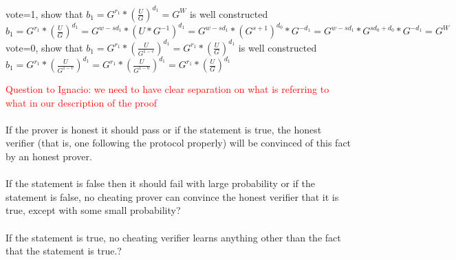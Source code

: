 \begin{infobox}[Explanation of \begin{math}b_1= G^{r_1} *(\frac{U}{G})^{d_1}\end{math}]
vote=1, show that \begin{math}b_1= G^{r_1} *(\frac{U}{G})^{d_1} = G^W\end{math} is well constructed \\
\begin{math}b_1= G^{r_1} *(\frac{U}{G})^{d_1} = G^{w-sd_1}*(U*G^{-1})^{d_1}= G^{w-sd_1}* (G^{s+1})^{d_0}*G^{-d_1} =  G^{w-sd_1}* G^{sd_0+d_0}*G^{-d_1}= G^W\end{math}\\
vote=0, show that  \begin{math}b_1= G^{r_1} *(\frac{U}{G^{1-v}})^{d_1} = G^{r_1} *(\frac{U}{G})^{d_1}\end{math} is well constructed\\
\begin{math}b_1= G^{r_1} *(\frac{U}{G^{1-v}})^{d_1} = G^{r_1} *(\frac{U}{G^{1-0}})^{d_1} = G^{r_1} *(\frac{U}{G})^{d_1}\end{math}
\end{infobox}



\begin{infobox}
\textcolor{red}{Question to Ignacio: we need to have clear separation on what is referring to what in our description of the proof}\\\\
 If the prover is honest it should pass or if the statement is true, the honest verifier (that is, one following the protocol properly)
will be convinced of this fact by an honest prover.\\\\
If the statement is false then it should fail with large probability or if the statement is false, no cheating prover can convince
the honest verifier that it is true, except with some small probability?\\\\
 If the statement is true, no cheating verifier learns anything other than the fact that the statement is true.?
\end{infobox}

